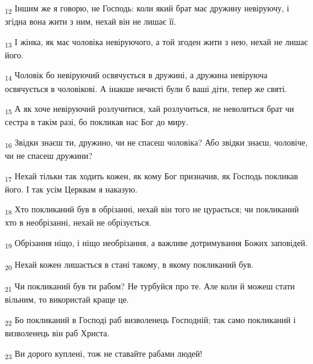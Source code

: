 \begin{tcolorbox}
\textsubscript{12} Іншим же я говорю, не Господь: коли який брат має дружину невіруючу, і згідна вона жити з ним, нехай він не лишає її.
\end{tcolorbox}
\begin{tcolorbox}
\textsubscript{13} І жінка, як має чоловіка невіруючого, а той згоден жити з нею, нехай не лишає його.
\end{tcolorbox}
\begin{tcolorbox}
\textsubscript{14} Чоловік бо невіруючий освячується в дружині, а дружина невіруюча освячується в чоловікові. А інакше нечисті були б ваші діти, тепер же святі.
\end{tcolorbox}
\begin{tcolorbox}
\textsubscript{15} А як хоче невіруючий розлучитися, хай розлучиться, не неволиться брат чи сестра в такім разі, бо покликав нас Бог до миру.
\end{tcolorbox}
\begin{tcolorbox}
\textsubscript{16} Звідки знаєш ти, дружино, чи не спасеш чоловіка? Або звідки знаєш, чоловіче, чи не спасеш дружини?
\end{tcolorbox}
\begin{tcolorbox}
\textsubscript{17} Нехай тільки так ходить кожен, як кому Бог призначив, як Господь покликав його. І так усім Церквам я наказую.
\end{tcolorbox}
\begin{tcolorbox}
\textsubscript{18} Хто покликаний був в обрізанні, нехай він того не цурається; чи покликаний хто в необрізанні, нехай не обрізується.
\end{tcolorbox}
\begin{tcolorbox}
\textsubscript{19} Обрізання ніщо, і ніщо необрізання, а важливе дотримування Божих заповідей.
\end{tcolorbox}
\begin{tcolorbox}
\textsubscript{20} Нехай кожен лишається в стані такому, в якому покликаний був.
\end{tcolorbox}
\begin{tcolorbox}
\textsubscript{21} Чи покликаний був ти рабом? Не турбуйся про те. Але коли й можеш стати вільним, то використай краще це.
\end{tcolorbox}
\begin{tcolorbox}
\textsubscript{22} Бо покликаний в Господі раб визволенець Господній; так само покликаний і визволенець він раб Христа.
\end{tcolorbox}
\begin{tcolorbox}
\textsubscript{23} Ви дорого куплені, тож не ставайте рабами людей!
\end{tcolorbox}
